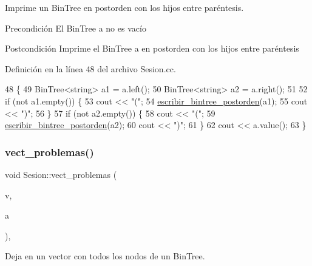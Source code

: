 Imprime un Bin\+Tree en postorden con los hijos entre paréntesis. 

\begin{DoxyPrecond}{Precondición}
El Bin\+Tree a no es vacío 
\end{DoxyPrecond}
\begin{DoxyPostcond}{Postcondición}
Imprime el Bin\+Tree a en postorden con los hijos entre paréntesis 
\end{DoxyPostcond}


Definición en la línea 48 del archivo Sesion.\+cc.


\begin{DoxyCode}
48                                                                       \{
49         BinTree<string> a1 = a.left();
50         BinTree<string> a2 = a.right();
51 
52         \textcolor{keywordflow}{if} (not a1.empty()) \{
53           cout << \textcolor{stringliteral}{"("};
54           \mbox{\hyperlink{class_sesion_aff16aa5e480925c7827221e326a345dc}{escribir\_bintree\_postorden}}(a1);
55           cout << \textcolor{stringliteral}{")"};
56         \}
57         \textcolor{keywordflow}{if} (not a2.empty()) \{
58           cout << \textcolor{stringliteral}{"("};
59           \mbox{\hyperlink{class_sesion_aff16aa5e480925c7827221e326a345dc}{escribir\_bintree\_postorden}}(a2);
60           cout << \textcolor{stringliteral}{")"};
61         \}
62         cout << a.value();
63       \}
\end{DoxyCode}
\mbox{\label{class_sesion_a9ed9478b2d860d8d713e19823febeaf3}} 
\subsubsection{\texorpdfstring{vect\+\_\+problemas()}{vect\_problemas()}}
{\footnotesize\ttfamily void Sesion\+::vect\+\_\+problemas (\begin{DoxyParamCaption}\item[{vector$<$ string $>$ \&}]{v,  }\item[{const Bin\+Tree$<$ string $>$ \&}]{a }\end{DoxyParamCaption})\hspace{0.3cm}{\ttfamily [static]}, {\ttfamily [private]}}



Deja en un vector con todos los nodos de un Bin\+Tree. 

